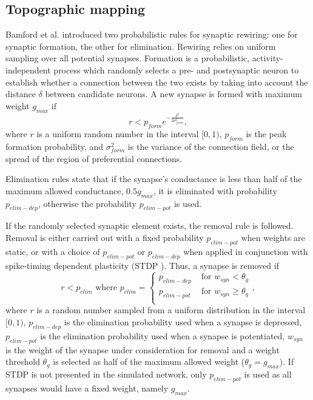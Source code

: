 \documentclass[letterpaper, 10 pt, conference]{ieeeconf}  %
\begin{document}
\subsection{Topographic mapping}

Bamford et al. \cite{bamford2010synaptic} introduced two probabilistic rules for synaptic rewiring: one for synaptic formation, the other for elimination.
Rewiring relies on uniform sampling over all potential synapses. 
Formation is a probabilistic, activity-independent process which randomly selects a pre- and postsynaptic neuron to establish whether a connection between the two exists by taking into account the distance $\delta$ between candidate neurons. A new synapse is formed with maximum weight $g_{max}$ if
%
\begin{equation} \label{eq:formation_rule}
r<p_{form}e^{-\frac{\delta^2}{2\sigma^2_{form}}},
\end{equation}
%
where $r$ is a uniform random number in the interval $[0, 1)$, $p_{form}$ is the peak formation probability, and $\sigma^2_{form}$ is the variance of the connection field, or the spread of the region of preferential connections.

Elimination rules state that if the synapse's conductance is less than half of the maximum allowed conductance, $0.5g_{max}$, it is eliminated with probability $p_{elim-dep}$, otherwise the probability $p_{elim-pot}$ is used.

If the randomly selected synaptic element exists, the removal rule is followed.
Removal is either carried out with a fixed probability $p_{elim-pot}$ when weights are static, or with a choice of $p_{elim-pot}$  or $p_{elim-dep}$ when applied in conjunction with spike-timing dependent plasticity (STDP \cite{Song2000}). Thus, a synapse is removed if
%
\begin{equation} \label{eq:elimination_rule}
r<p_{elim} \text{ where } p_{elim} = 
    \begin{cases}
        p_{elim-dep} & \text{ for }   w_{syn}  < \theta_g \\
        p_{elim-pot} & \text{ for }   w_{syn}  \geq \theta_g \\
    \end{cases},
\end{equation}
%
where $r$ is a random number sampled from a uniform distribution in the interval $[0, 1)$, $p_{elim-dep}$ is the elimination probability used when a synapse is depressed, $p_{elim-pot}$ is the elimination probability used when a synapse is potentiated, $w_{syn}$ is the weight of the synapse under consideration for removal and a weight threshold $\theta_g$ is selected as half of the maximum allowed weight ($ \theta_g = g_{max}$). 
If STDP is not presented in the simulated network, only $p_{elim-pot}$ is used as all synapses would have a fixed weight, namely $g_{max}$.
\end{document}

